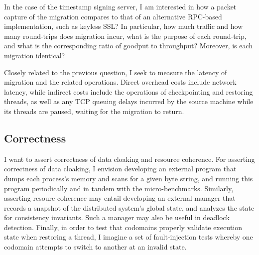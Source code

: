 In the case of the timestamp signing server, I am interested in how a packet
capture of the migration compares to that of an alternative RPC-based
implementation, such as keyless SSL\@?
%
In particular, how much traffic and how many round-trips does migration incur,
what is the purpose of each round-trip, and what is the corresponding ratio of
goodput to throughput?
%
Moreover, is each migration identical?


Closely related to the previous question, I seek to measure the latency of
migration and the related operations.
%
Direct overhead costs include network latency, while indirect costs include the
operations of checkpointing and restoring threads, as well as any TCP queuing
delays incurred by the source machine while its threads are paused, waiting for
the migration to return.

\subsection{Correctness}

I want to assert correctness of data cloaking and resource coherence.
%
For asserting correctness of data cloaking, I envision developing an external
program that dumps each process's memory and scans for a given byte string,
and running this program periodically and in tandem with the micro-benchmarks.
%
Similarly, asserting resoure coherence may entail developing an external
manager that records a snapshot of the distributed system's global state, and
analyzes the state for consistency invariants.
%
Such a manager may also be useful in deadlock detection.
%
Finally, in order to test that codomains properly validate execution state when
restoring a thread, I imagine a set of fault-injection tests whereby one
codomain attempts to switch to another at an invalid state.
